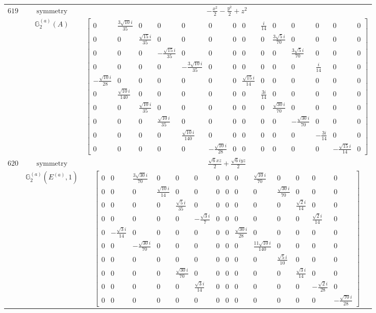 \documentclass[fleqn,8pt,landscape]{jsarticle}
\begin{document}
\begin{longtable}{ccc}
$ 619 $ & $ \text{symmetry} $ & $ - \frac{x^{2}}{2} - \frac{y^{2}}{2} + z^{2} $ \\
$  $ & $ \mathbb{G}_{2}^{(a)}(A) $ & $ \begin{bmatrix} 0 & \frac{3 \sqrt{10} i}{35} & 0 & 0 & 0 & 0 & 0 & 0 & \frac{i}{14} & 0 & 0 & 0 & 0 & 0 \\ 0 & 0 & \frac{\sqrt{15} i}{35} & 0 & 0 & 0 & 0 & 0 & 0 & \frac{3 \sqrt{5} i}{70} & 0 & 0 & 0 & 0 \\ 0 & 0 & 0 & - \frac{\sqrt{15} i}{35} & 0 & 0 & 0 & 0 & 0 & 0 & \frac{3 \sqrt{5} i}{70} & 0 & 0 & 0 \\ 0 & 0 & 0 & 0 & - \frac{3 \sqrt{10} i}{35} & 0 & 0 & 0 & 0 & 0 & 0 & \frac{i}{14} & 0 & 0 \\ - \frac{\sqrt{10} i}{28} & 0 & 0 & 0 & 0 & 0 & 0 & \frac{\sqrt{15} i}{14} & 0 & 0 & 0 & 0 & 0 & 0 \\ 0 & \frac{\sqrt{10} i}{140} & 0 & 0 & 0 & 0 & 0 & 0 & \frac{3 i}{14} & 0 & 0 & 0 & 0 & 0 \\ 0 & 0 & \frac{\sqrt{10} i}{35} & 0 & 0 & 0 & 0 & 0 & 0 & \frac{\sqrt{30} i}{70} & 0 & 0 & 0 & 0 \\ 0 & 0 & 0 & \frac{\sqrt{10} i}{35} & 0 & 0 & 0 & 0 & 0 & 0 & - \frac{\sqrt{30} i}{70} & 0 & 0 & 0 \\ 0 & 0 & 0 & 0 & \frac{\sqrt{10} i}{140} & 0 & 0 & 0 & 0 & 0 & 0 & - \frac{3 i}{14} & 0 & 0 \\ 0 & 0 & 0 & 0 & 0 & - \frac{\sqrt{10} i}{28} & 0 & 0 & 0 & 0 & 0 & 0 & - \frac{\sqrt{15} i}{14} & 0 \end{bmatrix} $ \\ \hline
$ 620 $ & $ \text{symmetry} $ & $ \frac{\sqrt{6} x z}{2} + \frac{\sqrt{6} i y z}{2} $ \\
$  $ & $ \mathbb{G}_{2}^{(a)}(E^{(a)},1) $ & $ \begin{bmatrix} 0 & 0 & \frac{3 \sqrt{30} i}{70} & 0 & 0 & 0 & 0 & 0 & 0 & \frac{\sqrt{10} i}{70} & 0 & 0 & 0 & 0 \\ 0 & 0 & 0 & \frac{\sqrt{10} i}{14} & 0 & 0 & 0 & 0 & 0 & 0 & \frac{\sqrt{30} i}{70} & 0 & 0 & 0 \\ 0 & 0 & 0 & 0 & \frac{\sqrt{5} i}{35} & 0 & 0 & 0 & 0 & 0 & 0 & \frac{\sqrt{2} i}{14} & 0 & 0 \\ 0 & 0 & 0 & 0 & 0 & - \frac{\sqrt{3} i}{7} & 0 & 0 & 0 & 0 & 0 & 0 & \frac{\sqrt{2} i}{14} & 0 \\ 0 & - \frac{\sqrt{3} i}{14} & 0 & 0 & 0 & 0 & 0 & 0 & \frac{\sqrt{30} i}{28} & 0 & 0 & 0 & 0 & 0 \\ 0 & 0 & - \frac{\sqrt{30} i}{70} & 0 & 0 & 0 & 0 & 0 & 0 & \frac{11 \sqrt{10} i}{140} & 0 & 0 & 0 & 0 \\ 0 & 0 & 0 & 0 & 0 & 0 & 0 & 0 & 0 & 0 & \frac{\sqrt{5} i}{10} & 0 & 0 & 0 \\ 0 & 0 & 0 & 0 & \frac{\sqrt{30} i}{70} & 0 & 0 & 0 & 0 & 0 & 0 & \frac{\sqrt{3} i}{14} & 0 & 0 \\ 0 & 0 & 0 & 0 & 0 & \frac{\sqrt{3} i}{14} & 0 & 0 & 0 & 0 & 0 & 0 & - \frac{\sqrt{2} i}{28} & 0 \\ 0 & 0 & 0 & 0 & 0 & 0 & 0 & 0 & 0 & 0 & 0 & 0 & 0 & - \frac{\sqrt{70} i}{28} \end{bmatrix} $ \\ \hline

\end{longtable}
\end{document}
